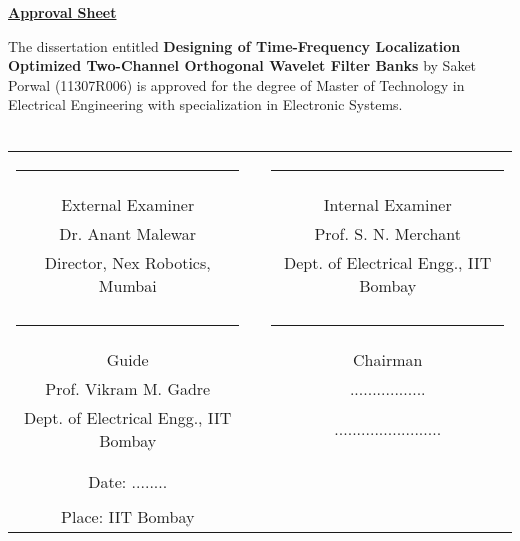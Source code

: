 \documentclass{article}
\begin{document}
\begin{titlepage}
\onehalfspacing
\begin{center}
	
\vspace{1cm}
\textbf{\large{\underline{Approval Sheet}}}\\
\vspace{0.5cm}
\end{center}
\doublespacing
The dissertation entitled \textbf{Designing of Time-Frequency Localization Optimized Two-Channel Orthogonal Wavelet Filter Banks} by Saket Porwal (11307R006) is approved for the degree of Master of Technology in Electrical Engineering with specialization in Electronic Systems.
\\ \\
\begin{center}
 \vfill \vfill
 \begin{tabular}{ccc}
      \rule{6cm}{1sp}                & \rule{10mm}{0pt} & \rule{6cm}{1sp} \\
      {\Large External Examiner}              && {\Large Internal Examiner} \\
      {Dr. Anant Malewar}	     && {Prof. S. N. Merchant} \\			  	
      {Director, Nex Robotics, Mumbai} && {Dept. of Electrical Engg., IIT Bombay } \\[0.2in]\\
      \rule{6cm}{1sp}                & \rule{10mm}{0pt} & \rule{6cm}{1sp} \\
      {\Large Guide}                 && {\Large Chairman} \\
      {Prof. Vikram M. Gadre}	     && {.................} \\
      {Dept. of Electrical Engg., IIT Bombay}	     && {........................}\\[0.2in]\\	\\
      {\Large Date: ........ }   && \\ && \\
      {\Large Place: IIT Bombay}	&&	
   \end{tabular}
 \vfill \vfill
% 
\end{center}
\end{titlepage}
\end{document}
